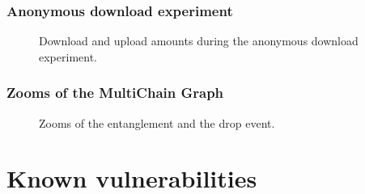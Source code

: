 \documentclass{beamer}
\begin{document}
\begin{frame}
\frametitle{Anonymous download experiment}

\begin{figure}
    \centering
    \begin{adjustwidth}{-3em}{-3em}
    \hspace{0em}%
    \end{adjustwidth}
    \caption{Download and upload amounts during the anonymous download experiment.}
\end{figure}

\end{frame}

\begin{frame}
\frametitle{Zooms of the MultiChain Graph}
\begin{figure}
    \centering
    \begin{adjustwidth}{-3em}{-3em}
    \hspace{0em}%
    \end{adjustwidth}
    \caption{Zooms of the entanglement and the drop event.}
\end{figure}
\end{frame}

\section{Known vulnerabilities}
\end{document}

